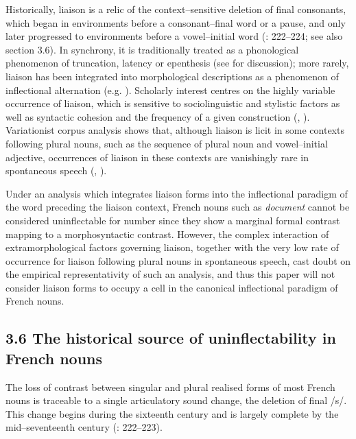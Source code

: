\documentclass[output=paper]{langscibook}
\begin{document}
Historically, liaison is a relic of the context–sensitive deletion of final consonants, which began in environments before a consonant–final word or a pause, and only later progressed to environments before a vowel–initial word (\citealt{Pope1934}: 222–224; see also section 3.6). In synchrony, it is traditionally treated as a phonological phenomenon of truncation, latency or epenthesis (see \citealt{DurandEtAl2011} for discussion); more rarely, liaison has been integrated into morphological descriptions as a phenomenon of inflectional alternation (e.g. \citealt{BonamiBoyé2005}). Scholarly interest centres on the highly variable occurrence of liaison, which is sensitive to sociolinguistic and stylistic factors as well as syntactic cohesion and the frequency of a given construction (\citealt{DurandEtAl2011}, \citealt{DurandLyche2016}). Variationist corpus analysis shows that, although liaison is licit in some contexts following plural nouns, such as the sequence of plural noun and vowel–initial adjective, occurrences of liaison in these contexts are vanishingly rare in spontaneous speech (\citealt{DurandEtAl2011}, \citealt{DurandLyche2016}). 

Under an analysis which integrates liaison forms into the inflectional paradigm of the word preceding the liaison context, French nouns such as \textit{document} cannot be considered uninflectable for number since they show a marginal formal contrast mapping to a morphosyntactic contrast. However, the complex interaction of extramorphological factors governing liaison, together with the very low rate of occurrence for liaison following plural nouns in spontaneous speech, cast doubt on the empirical representativity of such an analysis, and thus this paper will not consider liaison forms to occupy a cell in the canonical inflectional paradigm of French nouns. 

\subsection{3.6   The historical source of uninflectability in French nouns}

The loss of contrast between singular and plural realised forms of most French nouns is traceable to a single articulatory sound change, the deletion of final /s/. This change begins during the sixteenth century and is largely complete by the mid–seventeenth century (\citealt{Pope1934}: 222–223). 
\end{document}
